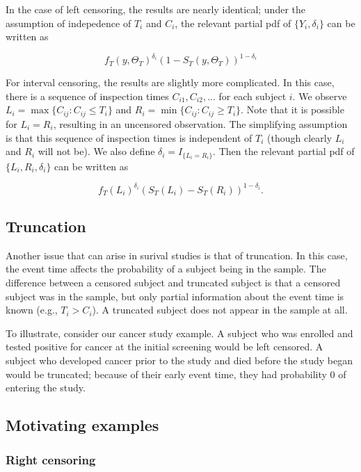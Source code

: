 \documentclass[a4paper]{article}
\begin{document}
  In the case of left censoring, the results are nearly identical; under the assumption of indepedence of $T_i$ and $C_i$, the relevant partial pdf of $\{Y_i, \delta_i\}$ can be written as 
  
  \[
  f_T(y, \Theta_T)^{\delta_i} (1-S_T(y, \Theta_T))^{1-\delta_i}
  \]
  
  For interval censoring, the results are slightly more complicated. In this case, there is a sequence of inspection times $C_{i1}, C_{i2}, ...$ for each subject $i$. We observe $L_i = \max\{C_{ij}: C_{ij} \leq T_i\}$ and $R_i = \min \{C_{ij}: C_{ij} \geq T_i\}$. Note that it is possible for $L_i = R_i$, resulting in an uncensored observation. The simplifying assumption is that this sequence of inspection times is independent of $T_i$ (though clearly $L_i$ and $R_i$ will not be). We also define $\delta_i = I_{\{L_i = R_i\}}$. Then the relevant partial pdf of $\{L_i, R_i, \delta_i\}$ can be written as 
  
  \[
  f_T(L_i) ^ {\delta_i} (S_T(L_i) - S_T(R_i)) ^ {1 -\delta_i}.
  \]

  \subsection{Truncation}
  
  Another issue that can arise in surival studies is that of truncation. In this case, the event time affects the probability of a subject being in the sample. The difference between a censored subject and truncated subject is that a censored subject was in the sample, but only partial information about the event time is known (e.g., $T_i > C_i$). A truncated subject does not appear in the sample at all. 
  
  To illustrate, consider our cancer study example. A subject who was enrolled and tested positive for cancer at the initial screening would be left censored. A subject who developed cancer prior to the study and died before the study began would be truncated; because of their early event time, they had probability 0 of entering the study. 

  \subsection{Motivating examples}
    
    \subsubsection{Right censoring}
    
\end{document}
